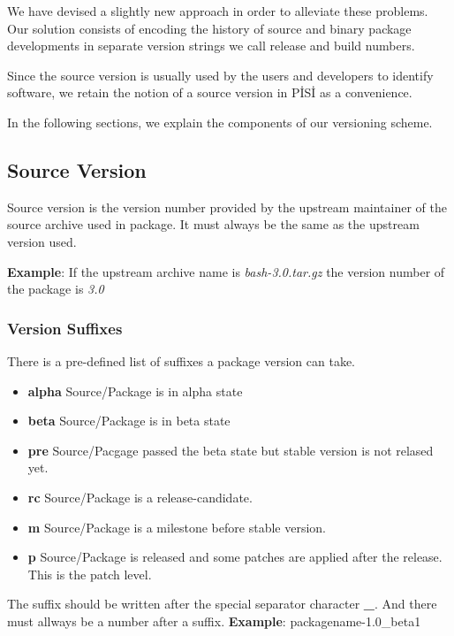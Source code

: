 \documentclass[a4paper,11pt]{article}
\begin{document}
We have devised a slightly new approach in order to alleviate these
problems. Our solution consists of encoding the history of source and
binary package developments in separate version strings we call release and
build numbers.

Since the source version is usually used by the users and developers
to identify software, we retain the notion of a source version in
P\.IS\.I as a convenience.

In the following sections, we explain the components of our
versioning scheme.

\subsection{Source Version}

Source version is the version number provided by the
upstream maintainer of the source archive used in package. It must
always be the same as the upstream version used.

\textbf{Example}: If the upstream archive name is
\emph{bash-3.0.tar.gz} the version number of the package is \emph{3.0}

\subsubsection{Version Suffixes}

There is a pre-defined list of suffixes a package version can
take.

\begin{itemize}
  \item \textbf{alpha} Source/Package is in alpha state
  \item \textbf{beta} Source/Package is in beta state
  \item \textbf{pre} Source/Pacgage passed the beta state but stable
    version is not relased yet.
  \item \textbf{rc} Source/Package is a release-candidate.
  \item \textbf{m} Source/Package is a milestone before stable version.
  \item \textbf{p} Source/Package is released and some patches are
    applied after the release. This is the patch level.
\end{itemize}

The suffix should be written after the special separator
character \textbf{\_}. And there must allways be a number after a
suffix. \textbf{Example}: packagename-1.0\_beta1
\end{document}
